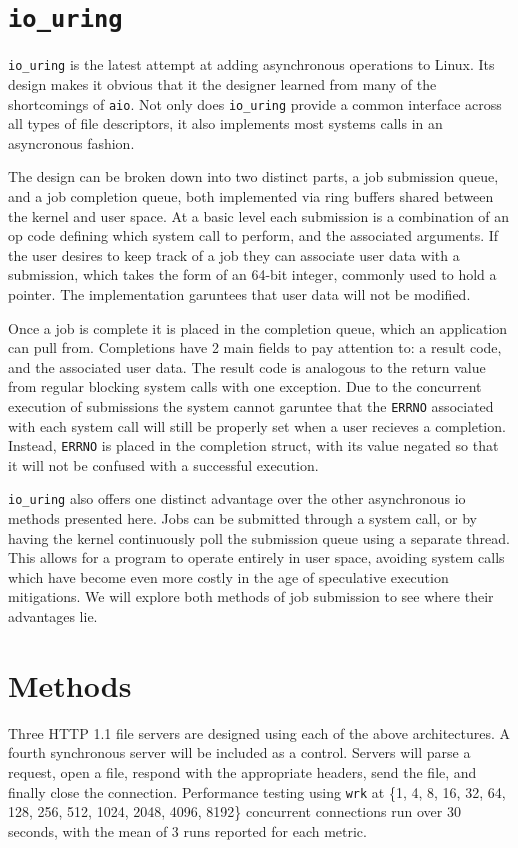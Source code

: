 \documentclass[letterpaper, 10pt, twocolumn]{article}
\begin{document}
\section{\texttt{io\_uring}}
\label{sec:orgccb7d8d}
\texttt{io\_uring} is the latest attempt at adding asynchronous operations to Linux. Its design makes it obvious that it the designer learned from many of the shortcomings of \texttt{aio}. Not only does \texttt{io\_uring} provide a common interface across all types of file descriptors, it also implements most systems calls in an asyncronous fashion.

The design can be broken down into two distinct parts, a job submission queue, and a job completion queue, both implemented via ring buffers shared between the kernel and user space. At a basic level each submission is a combination of an op code defining which system call to perform, and the associated arguments. If the user desires to keep track of a job they can associate user data with a submission, which takes the form of an 64-bit integer, commonly used to hold a pointer. The implementation garuntees that user data will not be modified.

Once a job is complete it is placed in the completion queue, which an application can pull from. Completions have 2 main fields to pay attention to: a result code, and the associated user data. The result code is analogous to the return value from regular blocking system calls with one exception. Due to the concurrent execution of submissions the system cannot garuntee that the \texttt{ERRNO} associated with each system call will still be properly set when a user recieves a completion. Instead, \texttt{ERRNO} is placed in the completion struct, with its value negated so that it will not be confused with a successful execution.

\texttt{io\_uring} also offers one distinct advantage over the other asynchronous io methods presented here. Jobs can be submitted through a system call, or by having the kernel continuously poll the submission queue using a separate thread. This allows for a program to operate entirely in user space, avoiding system calls which have become even more costly in the age of speculative execution mitigations. We will explore both methods of job submission to see where their advantages lie.
\section{Methods}
\label{sec:org4a9fdbb}
Three HTTP 1.1 file servers are designed using each of the above architectures. A fourth synchronous server will be included as a control. Servers will parse a request, open a file, respond with the appropriate headers, send the file, and finally close the connection. Performance testing using \texttt{wrk} at \{1, 4, 8, 16, 32, 64, 128, 256, 512, 1024, 2048, 4096, 8192\} concurrent connections run over 30 seconds, with the mean of 3 runs reported for each metric.
\end{document}

